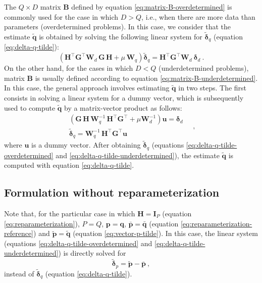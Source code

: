 The $Q \times D$ matrix $\mathbf{B}$ defined by equation \ref{eq:matrix-B-overdetermined} is commonly used for the case 
in which $D > Q$, i.e., when there are more data than parameters (overdetermined problems).
In this case, we consider that the estimate $\tilde{\mathbf{q}}$ is obtained by solving the following linear system
for $\tilde{\boldsymbol{\delta}}_{q}$ (equation \ref{eq:delta-q-tilde}):
\begin{equation}
	\left( \mathbf{H}^{\top} \mathbf{G}^{\top} \mathbf{W}_{d} \, \mathbf{G} \, \mathbf{H} + 
	\mu \, \mathbf{W}_{q} \right) 
	\tilde{\boldsymbol{\delta}}_{q} = 
	\mathbf{H}^{\top} \mathbf{G}^{\top} \mathbf{W}_{d} \: 
	\boldsymbol{\delta}_{d} \: .
	\label{eq:delta-q-tilde-overdetermined}
\end{equation}
On the other hand, for the cases in which $D < Q$ (underdetermined problems), matrix $\mathbf{B}$ is 
usually defined according to equation \ref{eq:matrix-B-underdetermined}. In this case, the general approach involves 
estimating $\tilde{\mathbf{q}}$ in two steps. The first consists in solving a linear system 
for a dummy vector, which is subsequently used to compute $\tilde{\mathbf{q}}$ by a matrix-vector product as follows:
\begin{equation}
	\begin{split}
		\left( \mathbf{G} \, \mathbf{H} \, \mathbf{W}_{q}^{-1} \,
		\mathbf{H}^{\top}\mathbf{G}^{\top} + \mu \mathbf{W}_{d}^{-1} \right)  
		\mathbf{u} = \boldsymbol{\delta}_{d} \\
		\tilde{\boldsymbol{\delta}}_{q} = \mathbf{W}_{q}^{-1} \, \mathbf{H}^{\top} \mathbf{G}^{\top} \mathbf{u}
	\end{split} \quad ,
	\label{eq:delta-q-tilde-underdetermined}
\end{equation}
where $\mathbf{u}$ is a dummy vector.
After obtaining $\tilde{\boldsymbol{\delta}}_{q}$ (equations \ref{eq:delta-q-tilde-overdetermined} and \ref{eq:delta-q-tilde-underdetermined}),
the estimate $\tilde{\mathbf{q}}$ is computed with equation \ref{eq:delta-q-tilde}.

\subsection{Formulation without reparameterization}
\label{subsec:formulation-without-reparameterization}

Note that, for the particular case in which $\mathbf{H} = \mathbf{I}_{P}$ (equation \ref{eq:reparameterization}), 
$P = Q$, $\mathbf{p} = \mathbf{q}$, $\bar{\mathbf{p}} = \bar{\mathbf{q}}$ (equation \ref{eq:reparameterization-reference}) and 
$\tilde{\mathbf{p}} = \tilde{\mathbf{q}}$ (equation \ref{eq:vector-p-tilde}).
In this case, the linear system (equations \ref{eq:delta-q-tilde-overdetermined} and \ref{eq:delta-q-tilde-underdetermined}) is directly 
solved for 
\begin{equation}
	\tilde{\boldsymbol{\delta}}_{p} = \tilde{\mathbf{p}} - \bar{\mathbf{p}} \: ,
	\label{eq:delta-p-tilde}
\end{equation}
instead of $\tilde{\boldsymbol{\delta}}_{q}$ (equation \ref{eq:delta-q-tilde}).

